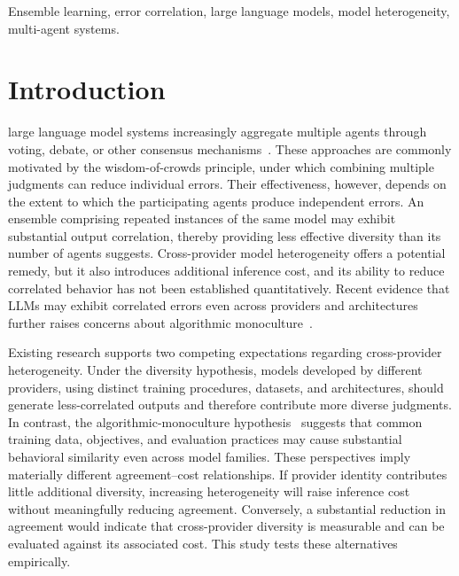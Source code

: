 \documentclass{ieeeaccess}
\begin{document}
\begin{keywords}
Ensemble learning, error correlation, large language models, model heterogeneity,
multi-agent systems.
\end{keywords}

\titlepgskip=-21pt

\maketitle


\section{Introduction}
\label{sec:introduction}
 large language model systems increasingly aggregate multiple agents
through voting, debate, or other consensus
mechanisms~\cite{du2023debate,wang2024moa}. These approaches are commonly
motivated by the wisdom-of-crowds principle, under which combining multiple
judgments can reduce individual errors. Their effectiveness, however, depends on
the extent to which the participating agents produce independent errors. An
ensemble comprising repeated instances of the same model may exhibit substantial
output correlation, thereby providing less effective diversity than its number
of agents suggests. Cross-provider model heterogeneity offers a potential
remedy, but it also introduces additional inference cost, and its ability to
reduce correlated behavior has not been established quantitatively. Recent
evidence that LLMs may exhibit correlated errors even across providers and
architectures further raises concerns about algorithmic
monoculture~\cite{kim2025correlated}.

Existing research supports two competing expectations regarding cross-provider
heterogeneity. Under the diversity hypothesis, models developed by different
providers, using distinct training procedures, datasets, and architectures,
should generate less-correlated outputs and therefore contribute more diverse
judgments. In contrast, the algorithmic-monoculture
hypothesis~\cite{kim2025correlated} suggests that common training data,
objectives, and evaluation practices may cause substantial behavioral similarity
even across model families. These perspectives imply materially different
agreement--cost relationships. If provider identity contributes little
additional diversity, increasing heterogeneity will raise inference cost without
meaningfully reducing agreement. Conversely, a substantial reduction in
agreement would indicate that cross-provider diversity is measurable and can be
evaluated against its associated cost. This study tests these alternatives
empirically.
\end{document}

